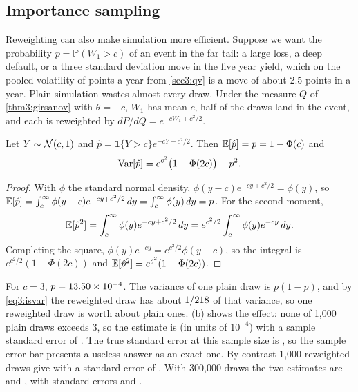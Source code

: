 \begin{chapterrefs}
\subsection{Importance sampling}

Reweighting can also make simulation more efficient. Suppose we want the probability
$p=\mathbb P(W_1>c)$ of an event in the far tail: a large loss, a deep default, or a three standard deviation
move in the five year yield, which on the pooled volatility of \canSigma{} points a year from \cref{sec3:qv} is a move
of about 2.5 points in a year. Plain simulation wastes almost every draw. Under the measure $Q$ of
\cref{thm3:girsanov} with $\theta=-c$, $W_1$ has mean $c$, half of the draws land in the event, and each
is reweighted by $dP/dQ=e^{-cW_1+c^2/2}$.

\begin{proposition}\label{prop3:is}
Let $Y\sim\mathcal{N}(c,1)$ and $\hat p=\mathbf 1\{Y>c\}e^{-cY+c^2/2}$. Then $\mathbb{E}[\hat p]=p=1-\Phi(c)$ and
\begin{equation}\label{eq3:isvar}
  \operatorname{Var}[\hat p] = e^{c^2}\bigl(1-\Phi(2c)\bigr)-p^2 .
\end{equation}
\end{proposition}

\begin{proof}
With $\phi$ the standard normal density, $\phi(y-c)e^{-cy+c^2/2}=\phi(y)$, so
$\mathbb{E}[\hat p]=\int_c^\infty\phi(y-c)e^{-cy+c^2/2}\,dy=\int_c^\infty\phi(y)\,dy=p$. For the second moment,
\begin{equation*}
  \mathbb{E}[\hat p^2]=\int_c^\infty\phi(y)e^{-cy+c^2/2}\,dy=e^{c^2/2}\int_c^\infty\phi(y)e^{-cy}\,dy .
\end{equation*}
Completing the square,
$\phi(y)e^{-cy}=e^{c^2/2}\phi(y+c)$, so the integral is $e^{c^2/2}(1-\Phi(2c))$ and
$\mathbb{E}[\hat p^2]=e^{c^2}(1-\Phi(2c))$.
\end{proof}

For $c=3$, $p=13.50\times10^{-4}$. The variance of one plain draw is $p(1-p)$, and by \cref{eq3:isvar} the
reweighted draw has about $1/218$ of that variance, so one reweighted draw is worth about \isRatio{}
plain ones. (b) shows the effect: none of 1{,}000 plain draws exceeds 3, so the
estimate is \isPlainSmall{} (in units of $10^{-4}$) with a sample standard error of \isPlainSmallSE. The
true standard error at this sample size is \isPlainSmallTrueSE, so the sample error bar presents a
useless answer as an exact one. By contrast 1{,}000
reweighted draws give \isSmall{} with a standard error of \isSmallSE. With 300{,}000 draws the two
estimates are \isPlainBig{} and \isBig, with standard errors \isPlainBigSE{} and \isBigSE.


\end{chapterrefs}

